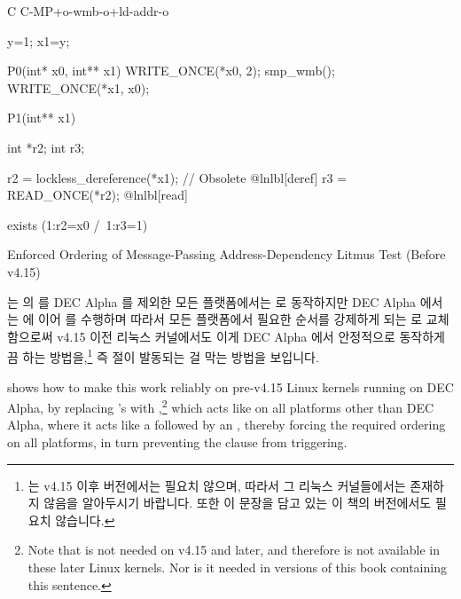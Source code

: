 \fi

\begin{listing}[tbp]
\begin{fcvlabel}
\begin{VerbatimL}[commandchars=\@\[\]]
C C-MP+o-wmb-o+ld-addr-o

{
y=1;
x1=y;
}

P0(int* x0, int** x1) {
	WRITE_ONCE(*x0, 2);
	smp_wmb();
	WRITE_ONCE(*x1, x0);
}

P1(int** x1) {
	int *r2;
	int r3;

	r2 = lockless_dereference(*x1); // Obsolete @lnlbl[deref]
	r3 = READ_ONCE(*r2);			    @lnlbl[read]
}

exists (1:r2=x0 /\ 1:r3=1)
\end{VerbatimL}
\end{fcvlabel}
\caption{Enforced Ordering of Message-Passing Address-Dependency Litmus Test (Before v4.15)}
\label{lst:memorder:Enforced Ordering of Message-Passing Address-Dependency Litmus Test (Before v4.15)}
\end{listing}

\begin{fcvref}
는  의  를 DEC Alpha 를 제외한 모든 플랫폼에서는
 로 동작하지만 DEC Alpha 에서는  에 이어
 를 수행하며 따라서 모든 플랫폼에서 필요한 순서를 강제하게 되는
 로 교체함으로써 v4.15 이전 리눅스 커널에서도 이게
DEC Alpha 에서 안정적으로 동작하게끔 하는 방법을,\footnote{
	 는 v4.15 이후 버전에서는 필요치 않으며,
	따라서 그 리눅스 커널들에서는 존재하지 않음을 알아두시기 바랍니다.
	또한 이 문장을 담고 있는 이 책의 버전에서도 필요치 않습니다.}
즉  절이 발동되는 걸 막는 방법을 보입니다.
\end{fcvref}

\iffalse

\begin{fcvref}
shows how to make this work reliably on pre-v4.15 Linux kernels running on
DEC Alpha, by replacing 's  with
,\footnote{
	Note that  is not needed on v4.15 and
	later, and therefore is not available in these later Linux kernels.
	Nor is it needed in versions of this book containing this sentence.}
which acts like  on all platforms other than DEC Alpha,
where it acts like a  followed by an ,
thereby forcing the required ordering on all platforms, in turn
preventing the  clause from triggering.
\end{fcvref}

